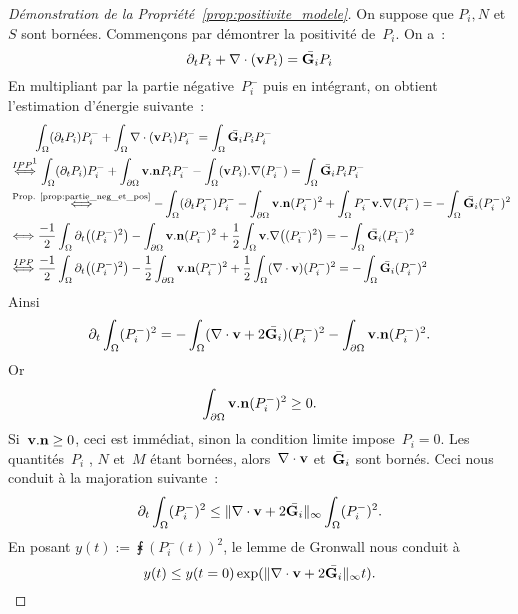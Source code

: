 \documentclass[main.tex]{subfiles}
\begin{document}
\begin{proof}[Démonstration de la Propriété~\ref{prop:positivite_modele}]
On suppose que $P_i,N$ et $S$ sont bornées. Commençons par démontrer la positivité de~$P_i$. On a~:
$$\partial_t P_i + \nabla\cdot (\mathbf{v} P_i) = \bar{{\bf G}_i}P_i $$
En multipliant par la partie négative~$P_i^-$ puis en intégrant, on obtient l'estimation d'énergie suivante~:
$$
\begin{aligned}
&\qquad \intx (\partial_t P_i) P_i^- + \intx \dive (\vit P_i) P_i^- = \intx \bar{\GG_i} P_i P_i^- \\
&\overset{IPP\protect\footnotemark}{\Longleftrightarrow} \intx (\partial_t P_i) P_i^- + \intbord \vit . \nn P_i P_i^- - \intx (\vit P_i).\nabla (P_i^-)  = \intx \bar{\GG_i} P_i P_i^-  \\
&\overset{\textrm{Prop. \ref{prop:partie_neg_et_pos}}}{\Longleftrightarrow}  - \intx (\partial_t P_i^-) P_i^- - \intbord \vit . \nn (P_i^-)^2 + \intx P_i^- \vit.\nabla (P_i^-)  = - \intx \bar{\GG_i} (P_i^-)^2  \\
&\Longleftrightarrow  \frac{-1}{2} \intx \partial_t \big( (P_i^-)^2 \big) - \intbord \vit . \nn (P_i^-)^2 + \frac{1}{2} \intx \vit.\nabla \big( (P_i^-)^2\big)   = - \intx \bar{\GG_i} (P_i^-)^2  \\
&\overset{IPP}{\Longleftrightarrow}  \frac{-1}{2} \intx \partial_t \big( (P_i^-)^2 \big) -\frac{1}{2} \intbord \vit . \nn (P_i^-)^2 + \frac{1}{2} \intx (\dive \vit)  (P_i^-)^2  = - \intx \bar{\GG_i} (P_i^-)^2  \\
\end{aligned}$$
Ainsi
\begin{equation}
\partial_t \int_\Omega (P_i^-)^2  = - \int_\Omega (\nabla\cdot \mathbf{v} + 2\bar{{\bf G}_i})  (P_i^-)^2 - \int_{\partial \Omega} \mathbf{v} . {\bf n} (P_i^-)^2.
\end{equation}
Or $$\int_{\partial \Omega} \mathbf{v} . {\bf n} (P_i^-)^2 \geq 0. $$
Si~$\mathbf{v}.{\bf n}\geq0$, ceci est immédiat, sinon la condition limite impose~$P_i=0$. 
Les quantités~$P_i$ , $N$ et~$M$ étant bornées, alors~$\nabla\cdot \mathbf{v}$ et~$\bar{{\bf G}}_i$ sont bornés. Ceci nous conduit à la majoration suivante~:
\begin{equation}
\partial_t \int_\Omega (P_i^-)^2 \leq \| \nabla\cdot \mathbf{v} + 2\bar{{\bf G}_i} \|_{\infty} \int_\Omega (P_i^-)^2.
\end{equation}
En posant $y(t):=\intx (P_i^-(t))^2$, le lemme de Gronwall nous conduit à
\begin{equation}
y(t) \leq y(t=0) \exp ( \| \nabla\cdot \mathbf{v} + 2\bar{{\bf G}_i} \|_{\infty} t  ).
\end{equation}

\end{proof}
\end{document}
